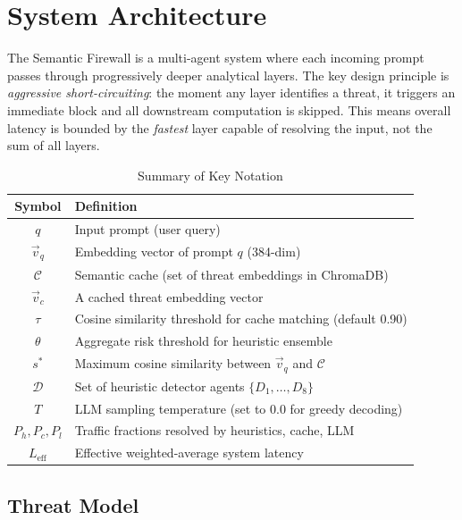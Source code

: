 \documentclass[conference]{IEEEtran}
\begin{document}
\section{System Architecture}

The Semantic Firewall is a multi-agent system where each
incoming prompt passes through progressively deeper analytical
layers. The key design principle is \textit{aggressive
short-circuiting}: the moment any layer identifies a threat, it
triggers an immediate block and all downstream computation is
skipped. This means overall latency is bounded by the
\textit{fastest} layer capable of resolving the input, not the sum
of all layers.

\begin{table}[h]
\centering
\caption{Summary of Key Notation}
\label{tab:notation}
\scriptsize
\begin{tabular}{@{}cl@{}}
\toprule
\textbf{Symbol} & \textbf{Definition} \\
\midrule
$q$ & Input prompt (user query) \\
$\vec{v}_q$ & Embedding vector of prompt $q$ (384-dim) \\
$\mathcal{C}$ & Semantic cache (set of threat embeddings in ChromaDB) \\
$\vec{v}_c$ & A cached threat embedding vector \\
$\tau$ & Cosine similarity threshold for cache matching (default 0.90) \\
$\theta$ & Aggregate risk threshold for heuristic ensemble \\
$s^*$ & Maximum cosine similarity between $\vec{v}_q$ and $\mathcal{C}$ \\
$\mathcal{D}$ & Set of heuristic detector agents $\{D_1, \ldots, D_8\}$ \\
$T$ & LLM sampling temperature (set to 0.0 for greedy decoding) \\
$P_h, P_c, P_l$ & Traffic fractions resolved by heuristics, cache, LLM \\
$L_{\text{eff}}$ & Effective weighted-average system latency \\
\bottomrule
\end{tabular}
\end{table}

\subsection{Threat Model}
\end{document}
